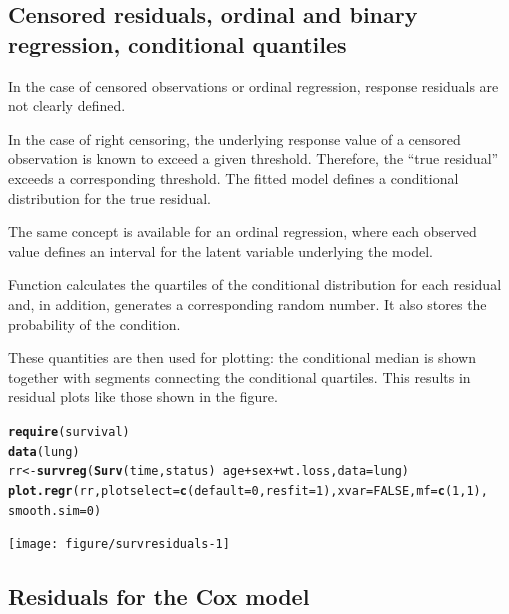 \documentclass[11pt]{article}\usepackage[]{graphicx}\usepackage[]{color}
\makeatletter
\newcommand{\hlnum}[1]{\textcolor[rgb]{0.686,0.059,0.569}{#1}}%
\newcommand{\hlopt}[1]{\textcolor[rgb]{0,0,0}{#1}}%
\newcommand{\hlstd}[1]{\textcolor[rgb]{0.345,0.345,0.345}{#1}}%
\newcommand{\hlkwb}[1]{\textcolor[rgb]{0.69,0.353,0.396}{#1}}%
\newcommand{\hlkwc}[1]{\textcolor[rgb]{0.333,0.667,0.333}{#1}}%
\newcommand{\hlkwd}[1]{\textcolor[rgb]{0.737,0.353,0.396}{\textbf{#1}}}%
\newenvironment{kframe}{%
 \def\at@end@of@kframe{}%
 \ifinner\ifhmode%
  \def\at@end@of@kframe{\end{minipage}}%
  \begin{minipage}{\columnwidth}%
 \fi\fi%
 \def\FrameCommand##1{\hskip\@totalleftmargin \hskip-\fboxsep
 \colorbox{shadecolor}{##1}\hskip-\fboxsep
     \hskip-\linewidth \hskip-\@totalleftmargin \hskip\columnwidth}%
 \MakeFramed {\advance\hsize-\width
   \@totalleftmargin\z@ \linewidth\hsize
   \@setminipage}}%
 {\par\unskip\endMakeFramed%
 \at@end@of@kframe}
\newenvironment{knitrout}{}{} %
\makeatother
\begin{document}
\subsection{Censored residuals, ordinal and binary regression, 
  conditional quantiles}

In the case of censored observations or ordinal regression,
response residuals are not clearly defined.

In the case of right censoring, the underlying response value of a censored
observation is known to exceed a given threshold. Therefore, the 
``true residual'' exceeds a corresponding threshold.
The fitted model defines a conditional distribution for the true residual.

The same concept is available for an ordinal regression, where each observed
value defines an interval for the latent variable underlying the model.

Function  calculates the quartiles of the conditional
distribution for each residual and, in addition, generates a corresponding
random number. It also stores the probability of the condition.

These quantities are then used for plotting: the conditional median is 
shown together with segments connecting the conditional quartiles.
This results in residual plots like those shown in the figure.

\begin{knitrout}
\color{fgcolor}\begin{kframe}
\begin{alltt}
\hlkwd{require}\hlstd{(survival)}
\hlkwd{data}\hlstd{(lung)}
\hlstd{rr} \hlkwb{<-} \hlkwd{survreg}\hlstd{(}\hlkwd{Surv}\hlstd{(time,status)} \hlopt{~} \hlstd{age}\hlopt{+}\hlstd{sex}\hlopt{+}\hlstd{wt.loss,} \hlkwc{data}\hlstd{=lung)}
\hlkwd{plot.regr}\hlstd{(rr,} \hlkwc{plotselect}\hlstd{=}\hlkwd{c}\hlstd{(}\hlkwc{default}\hlstd{=}\hlnum{0}\hlstd{,} \hlkwc{resfit}\hlstd{=}\hlnum{1}\hlstd{),} \hlkwc{xvar}\hlstd{=}\hlnum{FALSE}\hlstd{,} \hlkwc{mf}\hlstd{=}\hlkwd{c}\hlstd{(}\hlnum{1}\hlstd{,}\hlnum{1}\hlstd{),}
          \hlkwc{smooth.sim}\hlstd{=}\hlnum{0}\hlstd{)}
\end{alltt}
\end{kframe}
\texttt{[image: figure/survresiduals-1]} 

\end{knitrout}

\subsection{Residuals for the Cox model}
\end{document}

